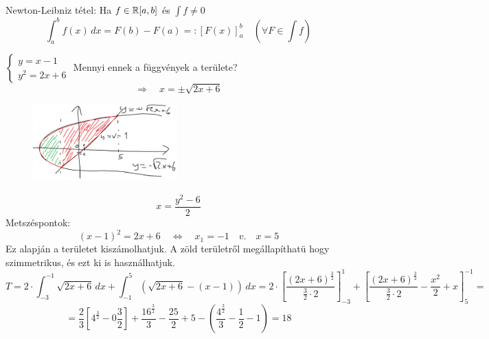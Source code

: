 \documentclass[a4paper,11.5pt]{article}
\begin{document}
		
	\begin{revision}
		Newton-Leibniz tétel: Ha $f\in\mathbb{R}[a,b]$ és $\int f\not=0$ 
			\[ \int_a^bf(x)\,dx=F(b)-F(a)=:[F(x)]_a^b\quad (\forall F\in\int f) \]
	\end{revision}
	\begin{example}		
		$\begin{cases}
			y=x-1\\
			y^2=2x+6
		\end{cases}$
		Mennyi ennek a függvények a területe?
		\[ \Rightarrow\quad x=\pm\sqrt{2x+6} \]
		\begin{figure}[H]
			\centering
			\includegraphics[height=3cm]{kepek/08.png}
			\caption{}
		\end{figure}
		\[ x=\frac{y^2-6}{2} \]
		Metszéspontok:
		\[ (x-1)^2=2x+6\quad \Leftrightarrow\quad x_1=-1\quad v.\quad x=5 \]
		Ez alapján a területet kiszámolhatjuk. A zöld területről megállapíthatü hogy szimmetrikus, és ezt ki is használhatjuk.
		\[ T=2\cdot\int_{-3}^{-1}\sqrt{2x+6}\,dx+\int_{-1}^{5}\left(\sqrt{2x+6}-(x-1)\right)\,dx=2\cdot\left[\frac{(2x+6)^{\frac{3}{2}}}{\frac{3}{2}\cdot2}\right]_{-3}^1+\left[\frac{(2x+6)^{\frac{3}{2}}}{\frac{3}{2}\cdot2}-\frac{x^2}{2}+x\right]_{5}^{-1}=\]
		\[=\frac{2}{3}\left[4^\frac{3}{2}-0\frac{3}{2}\right]+\frac{16^\frac{3}{2}}{3}-\frac{25}{2}+5-\left(\frac{4^\frac{3}{2}}{3}-\frac{1}{2}-1\right)=18  \]
	\end{example}
\end{document}
